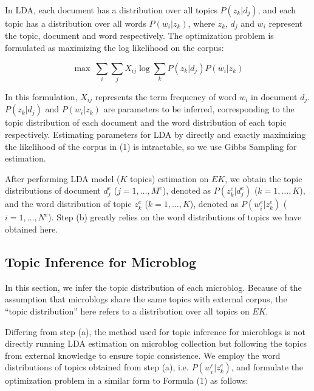 \documentclass[11pt]{article}
\begin{document}
In LDA, each document has a distribution over all topics $P(z_{k}|d_{j})$, and each topic has a distribution over all words $P(w_{i}|z_{k})$, where $z_{k}$, $d_{j}$ and $w_{i}$ represent the topic, document and word respectively. The optimization problem is formulated as maximizing the log likelihood on the corpus:


\begin{equation}
\max \ \sum_{i}\sum_{j}X_{ij}\log\sum_{k}P(z_{k}|d_{j})P(w_{i}|z_{k})
\end{equation}


In this formulation, $X_{ij}$ represents the term frequency of word $w_{i}$ in document $d_{j}$. $P(z_{k}|d_{j})$ and $P(w_{i}|z_{k})$ are parameters to be inferred, corresponding to the topic distribution of each document and the word distribution of each topic respectively. Estimating parameters for LDA by directly and exactly maximizing the likelihood of the corpus in (1) is intractable, so we use Gibbs Sampling for estimation.

After performing LDA model ($K$ topics) estimation on $EK$, we obtain the topic distributions of document $d^{e}_{j}$ ($j=1,\ldots,M^{e}$), denoted as $P(z^{e}_{k}|d^{e}_{j})$ ($k=1,\ldots,K$), and the word distribution of topic $z^{e}_{k}$ ($k=1,\ldots,K$), denoted as $P(w^{e}_{i}|z^{e}_{k})$ ($i=1,\ldots,N^{e}$). Step (b) greatly relies on the word distributions of topics we have obtained here.

\subsection{Topic Inference for Microblog}\label{step_b}

In this section, we infer the topic distribution of each microblog. Because of the assumption that microblogs share the same topics with external corpus, the ``topic distribution'' here refers to a distribution over all topics on $EK$.

\iffalse
If we regard certain topics as the bases of a space, the topic distribution of a document will correspond to a point in this space, and we can call this space a {\bf topic space}.
\fi

Differing from step (a), the method used for topic inference for microblogs is not directly running LDA estimation on microblog collection but following the topics from external knowledge to ensure topic consistence. We employ the word distributions of topics obtained from step (a), i.e. $P(w^{e}_{i}|z^{e}_{k})$, and formulate the optimization problem in a similar form to Formula (1) as follows:
\end{document}
